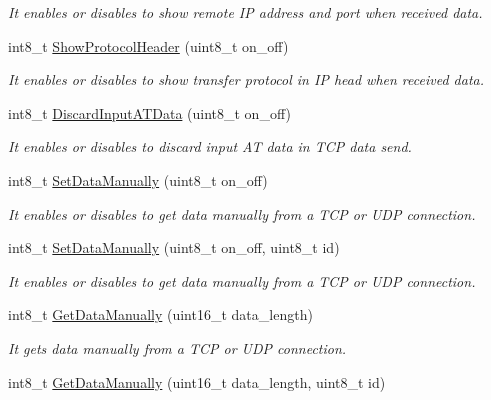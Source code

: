 \begin{DoxyCompactItemize}
\begin{DoxyCompactList}\small\item\em It enables or disables to show remote IP address and port when received data. \end{DoxyCompactList}\item 
int8\+\_\+t \hyperlink{class_wasp_g_p_r_s___pro__core_abb2048b854247e70cba6df718629f267}{Show\+Protocol\+Header} (uint8\+\_\+t on\+\_\+off)
\begin{DoxyCompactList}\small\item\em It enables or disables to show transfer protocol in IP head when received data. \end{DoxyCompactList}\item 
int8\+\_\+t \hyperlink{class_wasp_g_p_r_s___pro__core_a5049366bf29796bcdfdabc55210d3795}{Discard\+Input\+A\+T\+Data} (uint8\+\_\+t on\+\_\+off)
\begin{DoxyCompactList}\small\item\em It enables or disables to discard input AT data in T\+CP data send. \end{DoxyCompactList}\item 
int8\+\_\+t \hyperlink{class_wasp_g_p_r_s___pro__core_a695a4ecf0d152e3fecad7ca9c0b46b9a}{Set\+Data\+Manually} (uint8\+\_\+t on\+\_\+off)
\begin{DoxyCompactList}\small\item\em It enables or disables to get data manually from a T\+CP or U\+DP connection. \end{DoxyCompactList}\item 
int8\+\_\+t \hyperlink{class_wasp_g_p_r_s___pro__core_af5214554a8c5e0d21b91fe7cee3ac85f}{Set\+Data\+Manually} (uint8\+\_\+t on\+\_\+off, uint8\+\_\+t id)
\begin{DoxyCompactList}\small\item\em It enables or disables to get data manually from a T\+CP or U\+DP connection. \end{DoxyCompactList}\item 
int8\+\_\+t \hyperlink{class_wasp_g_p_r_s___pro__core_a44b5cdf64b8c22cede7141e2807e8913}{Get\+Data\+Manually} (uint16\+\_\+t data\+\_\+length)
\begin{DoxyCompactList}\small\item\em It gets data manually from a T\+CP or U\+DP connection. \end{DoxyCompactList}\item 
int8\+\_\+t \hyperlink{class_wasp_g_p_r_s___pro__core_abe7eb30d99f322cbc3baf4e97aa4835c}{Get\+Data\+Manually} (uint16\+\_\+t data\+\_\+length, uint8\+\_\+t id)

\end{DoxyCompactItemize}
